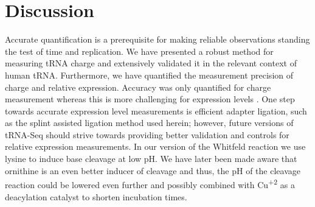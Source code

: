 \documentclass[9pt,lineno]{elife}
\begin{document}
\begin{figure}[ht!]
\label{figsupp:f6S2}
\end{figure}






\section{Discussion}
Accurate quantification is a prerequisite for making reliable observations standing the test of time and replication.
We have presented a robust method for measuring tRNA charge and extensively validated it in the relevant context of human tRNA.
Furthermore, we have quantified the measurement precision of charge and relative expression.
Accuracy was only quantified for charge measurement whereas this is more challenging for expression levels \citep{Fuchs2015-nb}.
One step towards accurate expression level measurements is efficient adapter ligation, such as the splint assisted ligation method used herein; however, future versions of tRNA-Seq should strive towards providing better validation and controls for relative expression measurements.
In our version of the Whitfeld reaction we use lysine to induce base cleavage at low pH.
We have later been made aware that ornithine is an even better inducer of cleavage \citep{Uziel1975-ja} and thus, the pH of the cleavage reaction could be lowered even further and possibly combined with Cu\textsuperscript{+2} as a deacylation catalyst \citep{Kroll1952-ci, Schofield1968-qn} to shorten incubation times.
\end{document}
